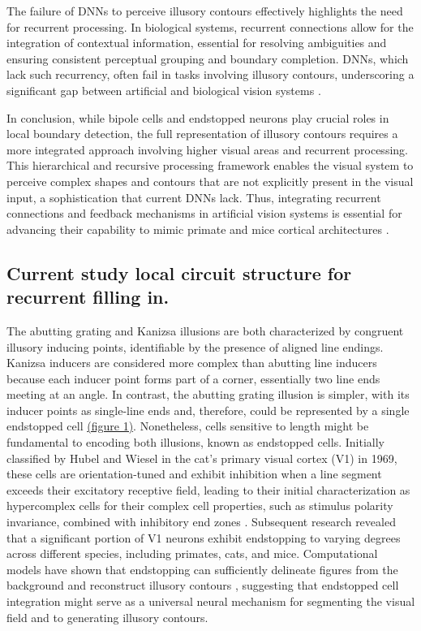 \documentclass[12pt]{article}
\begin{document}
The failure of DNNs to perceive illusory contours effectively highlights the need for recurrent processing. In biological systems, recurrent connections allow for the integration of contextual information, essential for resolving ambiguities and ensuring consistent perceptual grouping and boundary completion. DNNs, which lack such recurrency, often fail in tasks involving illusory contours, underscoring a significant gap between artificial and biological vision systems \autocite{grossbergTextureSegregationSurface1998}.

In conclusion, while bipole cells and endstopped neurons play crucial roles in local boundary detection, the full representation of illusory contours requires a more integrated approach involving higher visual areas and recurrent processing. This hierarchical and recursive processing framework enables the visual system to perceive complex shapes and contours that are not explicitly present in the visual input, a sophistication that current DNNs lack. Thus, integrating recurrent connections and feedback mechanisms in artificial vision systems is essential for advancing their capability to mimic primate and mice cortical architectures \autocite{grossbergHowVisualIllusions2014,grossbergTextureSegregationSurface1998}. 

\subsection{Current study local circuit structure for recurrent filling in.}
The abutting grating and Kanizsa illusions are both characterized by congruent illusory inducing points, identifiable by the presence of aligned line endings. Kanizsa inducers are considered more complex than abutting line inducers because each inducer point forms part of a corner, essentially two line ends meeting at an angle. In contrast, the abutting grating illusion is simpler, with its inducer points as single-line ends and, therefore, could be represented by a single endstopped cell \hyperref[fig:figure_1]{(figure 1)}.
Nonetheless, cells sensitive to length might be fundamental to encoding both illusions, known as endstopped cells. Initially classified by Hubel and Wiesel in the cat's primary visual cortex (V1) in 1969, these cells are orientation-tuned and exhibit inhibition when a line segment exceeds their excitatory receptive field, leading to their initial characterization as hypercomplex cells for their complex cell properties, such as stimulus polarity invariance, combined with inhibitory end zones \autocite{hubelRECEPTIVEFIELDSFUNCTIONAL1965}. Subsequent research revealed that a significant portion of V1 neurons exhibit endstopping to varying degrees  \autocite{deangelisLengthWidthTuning1994,jonesSurroundSuppressionPrimate2001,sceniakVisualSpatialCharacterization2001} across different species, including primates, cats, and mice. Computational models have shown that endstopping can sufficiently delineate figures from the background and reconstruct illusory contours \autocite{vonderheydtMechanismsContourPerception1989}, suggesting that endstopped cell integration might serve as a universal neural mechanism for segmenting the visual field and to generating illusory contours.
\end{document}
